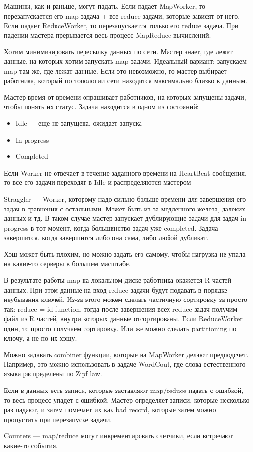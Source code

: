     \quad Машины, как и раньше, могут падать. Если падает MapWorker, то перезапускается его map задача + все reduce задачи, которые зависят от него. Если падает ReduceWorker, то перезапускается только его reduce задача. При падении мастера прерывается весь процесс MapReduce вычислений.
    
    \quad Хотим минимизировать пересылку данных по сети. Мастер знает, где лежат данные, на которых хотим запускать map задачи. Идеальный вариант: запускаем map там же, где лежат данные. Если это невозможно, то мастер выбирает работника, который по топологии сети находится максимально близко к данным.
    
    \quad Мастер время от времени опрашивает работников, на которых запущены задачи, чтобы понять их статус. Задача находится в одном из состояний:
    \begin{itemize}
        \item Idle --- еще не запущена, ожидает запуска
        \item In progress
        \item Completed
    \end{itemize}
    Если Worker не отвечает в течение заданного времени на HeartBeat сообщения, то все его задачи переходят в Idle и распределяются мастером
    
    \quad Straggler --- Worker, которому надо сильно больше времени для завершения его задач в сравнении с остальными. Может быть из-за медленного железа, далеких данных и тд. В таком случае мастер запускает дублирующие задачи для задач in progress в тот момент, когда большинство задач уже completed. Задача завершится, когда завершится либо она сама, либо любой дубликат.
    
    \quad Хэш может быть плохим, но можно задать его самому, чтобы нагрузка не упала на какие-то серверы в большем масштабе.
    
    \quad В результате работы map на локальном диске работника окажется R частей данных. При этом данные на вход reduce задачи будут подавать в порядке неубывания ключей. Из-за этого можем сделать частичную сортировку за просто так: reduce = id function, тогда после завершения всех reduce задач получим файл из R частей, внутри которых данные отсортированы. Если ReduceWorker один, то просто получаем сортировку. Или же можно сделать partitioning по ключу, а не по их хэшу.
    
    \quad Можно задавать combiner функции, которые на MapWorker делают предподсчет. Например, это можно использовать в задаче WordCout, где слова естественного языка распределены по Zipf law.
    
    \quad Если в данных есть записи, которые заставляют map/reduce падать с ошибкой, то весь процесс упадет с ошибкой. Мастер определяет записи, которые несколько раз падают, и затем помечает их как bad record, которые затем можно пропустить при перезапуске задачи.
    
    \quad Counters --- map/reduce могут инкрементировать счетчики, если встречают какие-то события.
